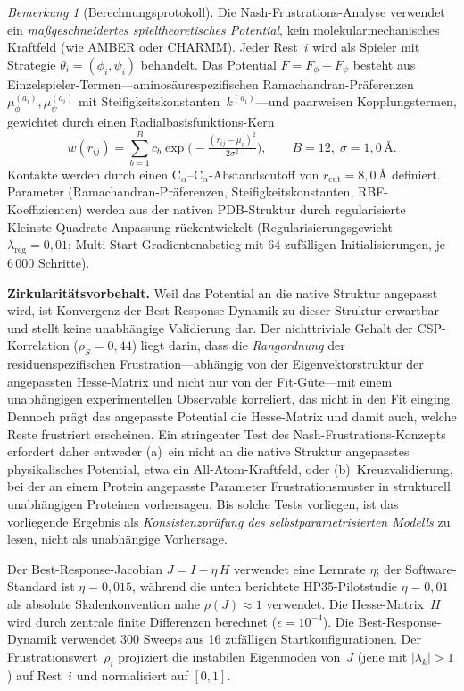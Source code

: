 \documentclass[12pt,a4paper]{article}
\theoremstyle{remark}
\newtheorem{remark}{Bemerkung}
\begin{document}
\begin{remark}[Berechnungsprotokoll]\label{rem:comp-protocol}
Die Nash-Frustrations-Analyse verwendet ein \emph{maßgeschneidertes spieltheoretisches Potential}, kein molekularmechanisches Kraftfeld (wie AMBER oder CHARMM).
Jeder Rest~$i$ wird als Spieler mit Strategie $\theta_i = (\phi_i, \psi_i)$ behandelt.
Das Potential $F = F_\phi + F_\psi$ besteht aus Einzelspieler-Termen---aminosäurespezifischen Ramachandran-Präferenzen $\mu_\phi^{(a_i)}, \mu_\psi^{(a_i)}$ mit Steifigkeitskonstanten~$k^{(a_i)}$---und paarweisen Kopplungstermen, gewichtet durch einen Radialbasisfunktions-Kern
\[
  w(r_{ij}) = \sum_{b=1}^{B} c_b \exp\!\bigl(-\tfrac{(r_{ij}-\mu_b)^2}{2\sigma^2}\bigr),
  \qquad B=12,\; \sigma = 1{,}0\,\text{\AA}.
\]
Kontakte werden durch einen C$_\alpha$--C$_\alpha$-Abstandscutoff von $r_\text{cut} = 8{,}0$\,\AA{} definiert.
Parameter (Ramachandran-Präferenzen, Steifigkeitskonstanten, RBF-Koeffizienten) werden aus der nativen PDB-Struktur durch regularisierte Kleinste-Quadrate-Anpassung rückentwickelt (Regularisierungsgewicht $\lambda_{\text{reg}} = 0{,}01$; Multi-Start-Gradientenabstieg mit 64 zufälligen Initialisierungen, je 6\,000 Schritte).

\textbf{Zirkularitätsvorbehalt.} Weil das Potential an die native Struktur angepasst wird, ist Konvergenz der Best-Response-Dynamik zu dieser Struktur erwartbar und stellt keine unabhängige Validierung dar. Der nichttriviale Gehalt der CSP-Korrelation ($\rho_S = 0{,}44$) liegt darin, dass die \emph{Rangordnung} der residuenspezifischen Frustration---abhängig von der Eigenvektorstruktur der angepassten Hesse-Matrix und nicht nur von der Fit-Güte---mit einem unabhängigen experimentellen Observable korreliert, das nicht in den Fit einging. Dennoch prägt das angepasste Potential die Hesse-Matrix und damit auch, welche Reste frustriert erscheinen. Ein stringenter Test des Nash-Frustrations-Konzepts erfordert daher entweder (a)~ein nicht an die native Struktur angepasstes physikalisches Potential, etwa ein All-Atom-Kraftfeld, oder (b)~Kreuzvalidierung, bei der an einem Protein angepasste Parameter Frustrationsmuster in strukturell unabhängigen Proteinen vorhersagen. Bis solche Tests vorliegen, ist das vorliegende Ergebnis als \emph{Konsistenzprüfung des selbstparametrisierten Modells} zu lesen, nicht als unabhängige Vorhersage.

Der Best-Response-Jacobian $J = I - \eta\, H$ verwendet eine Lernrate $\eta$; der Software-Standard ist $\eta = 0{,}015$, während die unten berichtete HP35-Pilotstudie $\eta = 0{,}01$ als absolute Skalenkonvention nahe $\rho(J) \approx 1$ verwendet. Die Hesse-Matrix~$H$ wird durch zentrale finite Differenzen berechnet ($\epsilon = 10^{-4}$).
Die Best-Response-Dynamik verwendet 300 Sweeps aus 16 zufälligen Startkonfigurationen.
Der Frustrationswert~$\rho_i$ projiziert die instabilen Eigenmoden von~$J$ (jene mit $|\lambda_k| > 1$) auf Rest~$i$ und normalisiert auf $[0,1]$.


\end{remark}
\end{document}
